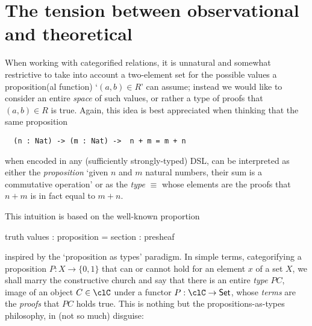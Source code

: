 \section{The tension between observational and theoretical}\label{sec_5_tension}
\label{sec:orge11c3c4}
When working with categorified relations, it is unnatural and somewhat restrictive to take into account a two-element set for the possible values a proposition(al function) `$(a,b)\in R$' can assume; instead we would like to consider an entire \emph{space} of such values, or rather a type of proofs that $(a,b)\in R$ is true. Again, this idea is best appreciated when thinking that the same proposition
\begin{center}
  \begin{verbatim}
  (n : Nat) -> (m : Nat) ->  n + m = m + n 
  \end{verbatim}
\end{center}
when encoded in any (sufficiently strongly-typed) DSL, can be interpreted as either the \emph{proposition} `given $n$ and $m$ natural numbers, their sum is a commutative operation' or as the \emph{type}  $\equiv$  whose elements are the proofs that $n+m$ is in fact equal to $m+n$.

This intuition is based on the well-known proportion
\begin{center}
  truth values : proposition = section : presheaf
\end{center}
inspired by the `proposition as types' paradigm. In simple terms, categorifying a proposition $P : X\to \{0,1\}$ that can or cannot hold for an element $x$ of a set $X$, we shall marry the constructive church and say that there is an entire \emph{type} $PC$, image of an object $C\in\clC$ under a functor $P : \clC \to \Set$, whose \emph{terms} are the \emph{proofs} that $PC$ holds true. This is nothing but the propositions-as-types philosophy, in (not so much) disguise: \cite{hottbook,wadler,martin1984intuitionistic}

